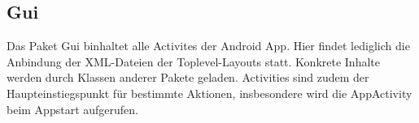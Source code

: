 \label{app:module:gui}\subsection{Gui}
Das Paket Gui binhaltet alle Activites der Android App. Hier findet lediglich die Anbindung der XML-Dateien der Toplevel-Layouts statt. Konkrete Inhalte werden durch Klassen anderer Pakete geladen. Activities sind zudem der Haupteinstiegspunkt für bestimmte Aktionen, insbesondere wird die AppActivity beim Appstart aufgerufen.